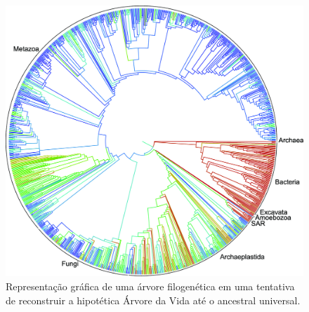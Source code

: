 \documentclass[english,brazilian]{UNISINOSmonografia} %
\begin{document}
\begin{figure}[tb]
\centering%
\begin{minipage}{.75\textwidth}
	\caption{Representação gráfica de uma árvore filogenética em uma tentativa de reconstruir a hipotética Árvore da Vida até o ancestral universal.}
	\label{fig:treeoflife}
	\vspace{1ex}
	\includegraphics[width=\textwidth]{treeoflife}
\end{minipage}
\end{figure}





\end{document}
